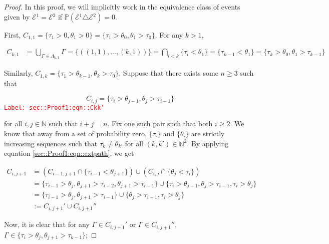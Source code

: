 \documentclass[12pt]{article}
\newcommand{\mb}{\mathbb}
\newcommand{\mc}{\mathcal}
\newcommand{\tr}{\textcolor{red}}
\newcommand{\labe}[1]{\tr{\texttt{Label: #1}}}
\newcommand{\ind}{\hspace{24pt}}
\newcommand{\pr}{\mb{P}}							%
\newcommand{\indx}[1]{_{#1}}					%
\newcommand{\rt}{\tau}							%
\newcommand{\rtt}{\theta}						%
\renewcommand{\it}{k}							%
\newcommand{\apath}{\Gamma}						%
\newcommand{\pathset}[2]{\Lambda_{#1,#2}}		%
\newcommand{\pathsete}[2]{C_{#1,#2}}			%
\newcommand{\evnt}{\mc{E}}						%
\begin{document}
\begin{proof}
In this proof, we will implicitly work in the equivalence class of events given by \(\evnt{}^1 = \evnt{}^2\) if \(\pr(\evnt{}^1 \triangle \evnt{}^2) = 0\).  

\ind First, \(\pathsete{1}{1} = \{\rt\indx{1} > 0,\rtt\indx{1} > 0\} = \{\rt\indx{1} > \rtt\indx{0},\rtt\indx{1}>\rt\indx{0}\}\). For any \(\it > 1\),

\begin{align*}
\pathsete{\it}{1} &= \bigcup_{\apath\indx{} \in \pathset{\it}{1}} \apath\indx{} = \{((1,1),\dots,(\it,1))\} = \bigcap_{i < \it} \{\rt\indx{i} < \rtt\indx{1}\} = \{\rt\indx{\it-1} < \rtt\indx{1}\} = \{\rt\indx{\it} > \rtt\indx{0},\rtt\indx{1} > \rt\indx{\it-1}\}
\end{align*}

Similarly, \(\pathsete{1}{\it} = \{\rt\indx{1} > \rtt\indx{\it-1}, \rtt\indx{\it} > \rt\indx{0}\}\). Suppose that there exists some \(n\geq 3\) such that

\begin{equation}
\pathsete{i}{j} = \{\rt\indx{i} > \rtt\indx{j-1},\rtt\indx{j} > \rt\indx{i-1}\}
\label{sec::Proof1:eqn::Ckk'}
\end{equation}
\labe{sec::Proof1:eqn::Ckk'}

for all \(i, j\in \mb{N}\) such that \(i+j = n\). Fix one such pair such that both \(i \geq 2\). We know that away from a set of probability zero, \(\{\rt\indx{\cdot}\}\) and \(\{\rtt\indx{\cdot}\}\) are strictly increasing sequences such that \(\rt\indx{\it} \neq \rtt\indx{\it'}\) for all \((\it,\it')\in \mb{N}^2\). By applying equation \eqref{sec::Proof1:eqn::extpath}, we get

\begin{align*}
\pathsete{i}{j+1} &= \left(\pathsete{i-1}{j+1} \cap \{\rt\indx{i - 1} < \rtt\indx{j+1}\}\right) \cup \left(\pathsete{i}{j}\cap \{\rtt\indx{j} < \rt\indx{i}\}\right)\\
&= \{\rt\indx{i - 1} > \rtt\indx{j}, \rtt\indx{j+1} > \rt\indx{i - 2},  \rtt\indx{j+1} > \rt\indx{i -1}\}\cup\{\rt\indx{i} > \rtt\indx{j-1}, \rtt\indx{j} > \rt\indx{i - 1},\rt\indx{i} > \rtt\indx{j}\}\\
&= \{\rt\indx{i - 1} > \rtt\indx{j}, \rtt\indx{j+1} > \rt\indx{i - 1}\}\cup\{\rtt\indx{j} > \rt\indx{i - 1},\rt\indx{i} > \rtt\indx{j}\}\\
&:= \pathsete{i}{j+1}' \cup\pathsete{i}{j+1}''
\end{align*}

Now, it is clear that for any \(\apath\indx{} \in \pathsete{i}{j+1}'\) or \(\apath\indx{} \in \pathsete{i}{j+1}''\), \(\apath\indx{}\in \{\rt\indx{i} > \rtt\indx{j},\rtt\indx{j+1} > \rt\indx{\it-1}\}\);


\end{proof}
\end{document}
